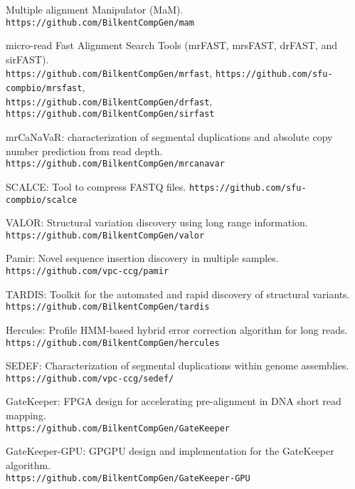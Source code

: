 \begin{list2}
\item
  Multiple alignment Manipulator (MaM).
  {\tt https://github.com/BilkentCompGen/mam}
\item
  micro-read Fast Alignment Search Tools (mrFAST, mrsFAST, drFAST, and sirFAST).\\
  {\tt https://github.com/BilkentCompGen/mrfast},
  {\tt https://github.com/sfu-compbio/mrsfast},\\
  {\tt https://github.com/BilkentCompGen/drfast},
  {\tt https://github.com/BilkentCompGen/sirfast}
\item
  mrCaNaVaR: characterization of segmental duplications and absolute copy number prediction from read depth.
  {\tt https://github.com/BilkentCompGen/mrcanavar}
\item
  SCALCE: Tool to compress FASTQ files. 
  {\tt https://github.com/sfu-compbio/scalce}
\item
  VALOR: Structural variation discovery using long range information. \\
  {\tt https://github.com/BilkentCompGen/valor}
\item
  Pamir: Novel sequence insertion discovery in multiple samples.
  {\tt https://github.com/vpc-ccg/pamir}
\item
  TARDIS: Toolkit for the automated and rapid discovery of structural variants.\\
  {\tt https://github.com/BilkentCompGen/tardis}
\item
  Hercules: Profile HMM-based hybrid error correction algorithm for long reads.\\
  {\tt https://github.com/BilkentCompGen/hercules}
\item
  SEDEF: Characterization of segmental duplications within genome assemblies.\\
  {\tt https://github.com/vpc-ccg/sedef/}
\item
  GateKeeper: FPGA design for accelerating pre-alignment in DNA short read mapping.\\
  {\tt https://github.com/BilkentCompGen/GateKeeper}


  \clearpage

  \item
  GateKeeper-GPU: GPGPU design and implementation for the GateKeeper algorithm.\\
  {\tt https://github.com/BilkentCompGen/GateKeeper-GPU}


\end{list2}
